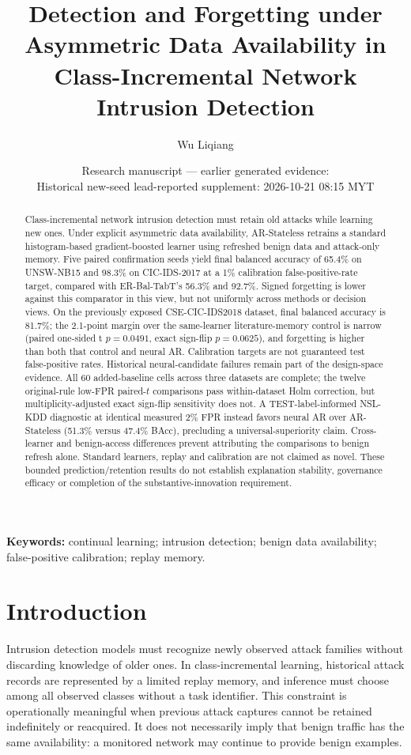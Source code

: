 \documentclass[10pt,twocolumn]{article}
\title{Detection and Forgetting under Asymmetric Data Availability in Class-Incremental Network Intrusion Detection}
\author{Wu Liqiang}
\date{Research manuscript --- earlier generated evidence: \EvidenceCutoff\\
Historical new-seed lead-reported supplement: 2026-10-21 08:15 MYT}
\begin{document}
\raggedbottom
\maketitle
\begin{abstract}
Class-incremental network intrusion detection must retain old attacks while learning new ones. Under explicit asymmetric data availability, AR-Stateless retrains a standard histogram-based gradient-boosted learner using refreshed benign data and attack-only memory. Five paired confirmation seeds yield final balanced accuracy of 65.4\% on UNSW-NB15 and 98.3\% on CIC-IDS-2017 at a 1\% calibration false-positive-rate target, compared with ER-Bal-TabT's 56.3\% and 92.7\%. Signed forgetting is lower against this comparator in this view, but not uniformly across methods or decision views. On the previously exposed CSE-CIC-IDS2018 dataset, final balanced accuracy is 81.7\%; the 2.1-point margin over the same-learner literature-memory control is narrow (paired one-sided t $p=0.0491$, exact sign-flip $p=0.0625$), and forgetting is higher than both that control and neural AR. Calibration targets are not guaranteed test false-positive rates. Historical neural-candidate failures remain part of the design-space evidence. All 60 added-baseline cells across three datasets are complete; the twelve original-rule low-FPR paired-$t$ comparisons pass within-dataset Holm correction, but multiplicity-adjusted exact sign-flip sensitivity does not. A TEST-label-informed NSL-KDD diagnostic at identical measured 2\% FPR instead favors neural AR over AR-Stateless (51.3\% versus 47.4\% BAcc), precluding a universal-superiority claim. Cross-learner and benign-access differences prevent attributing the comparisons to benign refresh alone. Standard learners, replay and calibration are not claimed as novel. These bounded prediction/retention results do not establish explanation stability, governance efficacy or completion of the substantive-innovation requirement.
\end{abstract}
\noindent\textbf{Keywords:} continual learning; intrusion detection; benign data availability; false-positive calibration; replay memory.

\section{Introduction}
Intrusion detection models must recognize newly observed attack families without discarding knowledge of older ones. In class-incremental learning, historical attack records are represented by a limited replay memory, and inference must choose among all observed classes without a task identifier. This constraint is operationally meaningful when previous attack captures cannot be retained indefinitely or reacquired. It does not necessarily imply that benign traffic has the same availability: a monitored network may continue to provide benign examples.
\end{document}
